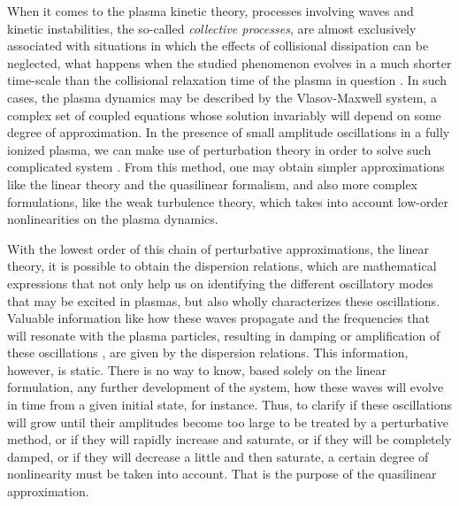 \documentclass[12pt,a4paper,ruledheader]{report}
\begin{document}
When it comes to the plasma kinetic theory, processes involving waves
and kinetic instabilities, the so-called \emph{collective processes},
are almost exclusively associated with situations in which the effects
of collisional dissipation can be neglected, what happens when the
studied phenomenon evolves in a much shorter time-scale than the
collisional relaxation time of the plasma in question \cite{akhi1967}.
In such cases, the plasma dynamics may be described by the Vlasov-Maxwell
system, a complex set of coupled equations whose solution invariably will
depend on some degree of approximation. In the presence of small
amplitude oscillations in a fully ionized plasma, we can make use
of perturbation theory in order to solve such complicated system
\cite{klimo}. From this method, one may obtain simpler approximations
like the linear theory and the quasilinear formalism, and also
more complex formulations, like the weak turbulence theory, which
takes into account low-order nonlinearities on the plasma dynamics.

With the lowest order of this chain of perturbative approximations, the
linear theory, it is possible to obtain the dispersion relations, which
are mathematical expressions that not only help us on identifying the
different oscillatory modes that may be excited in plasmas, but also
wholly characterizes these oscillations. Valuable information like
how these waves propagate and the frequencies that will resonate with
the plasma particles, resulting in damping or amplification of these
oscillations \cite{bitt,chen,gurnett2017}, are given by the dispersion
relations. This information, however, is static. There is no way to
know, based solely on the linear formulation, any further development
of the system, how these waves will evolve in time from a given initial
state, for instance. Thus, to clarify if these oscillations will grow
until their amplitudes become too large to be treated by a perturbative
method, or if they will rapidly increase and saturate, or if they will
be completely damped, or if they will decrease a little and then saturate, 
a certain degree of nonlinearity must be taken into account. That is the
purpose of the quasilinear approximation.
\end{document}
